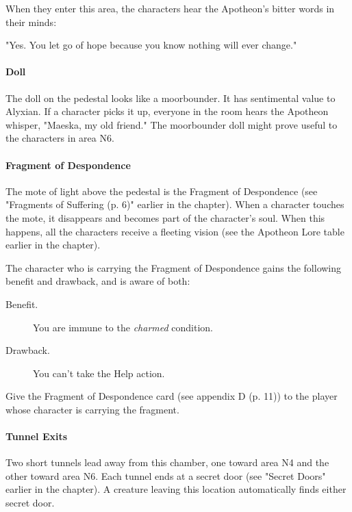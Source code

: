 \documentclass[a4paper, 11pt, bg=full, twocolumn, nooutline]{dndbook}
\begin{document}
When they enter this area, the characters hear the Apotheon's bitter words in their minds:

\begin{DndReadAloud}
"Yes. You let go of hope because you know nothing will ever change."
\end{DndReadAloud}

\paragraph{Doll}

The doll on the pedestal looks like a moorbounder. It has sentimental value to Alyxian. If a character picks it up, everyone in the room hears the Apotheon whisper, "Maeska, my old friend." The moorbounder doll might prove useful to the characters in area N6.

\paragraph{Fragment of Despondence}

The mote of light above the pedestal is the Fragment of Despondence (see "Fragments of Suffering (p. 6)" earlier in the chapter). When a character touches the mote, it disappears and becomes part of the character's soul. When this happens, all the characters receive a fleeting vision (see the Apotheon Lore table earlier in the chapter).

The character who is carrying the Fragment of Despondence gains the following benefit and drawback, and is aware of both:

\begin{DndSidebar}{}
\begin{description}
\item[Benefit.] You are immune to the \textit{charmed} condition.
\item[Drawback.] You can't take the Help action.
\end{description}
\end{DndSidebar}

Give the Fragment of Despondence card (see appendix D (p. 11)) to the player whose character is carrying the fragment.

\paragraph{Tunnel Exits}

Two short tunnels lead away from this chamber, one toward area N4 and the other toward area N6. Each tunnel ends at a secret door (see "Secret Doors" earlier in the chapter). A creature leaving this location automatically finds either secret door.
\end{document}
